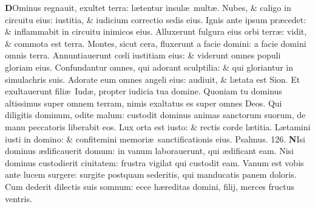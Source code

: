 \documentclass[a5paper,10pt]{book}
\def\ae{æ}
\def\oe{œ}
\begin{document}
\begin{multicols*}{2}
\vspace{-1em}
\lettrine[lines=2]{\bfseries \color{red} D}{}Ominus regnauit, exultet terra: l\ae tentur insul\ae \ mult\ae .
\newline \color{red} N\color{black}ubes, \& caligo in circuitu eius: iustitia, \& iudicium correctio sedis eius.
\newline \color{red} I\color{black}gnis ante ipsum pr\ae cedet: \& inflammabit in circuitu inimicos eius.
\newline \color{red} A\color{black}lluxerunt fulgura eius orbi terr\ae : vidit, \& commota est terra.%
\newline \color{red} M\color{black}ontes, sicut cera, fluxerunt a facie domini: a facie domini omnis terra.
\newline \color{red} A\color{black}nnuntiauerunt c\oe li iustitiam eius: \& viderunt omnes populi gloriam eius.
\newline \color{red} C\color{black}onfundantur omnes, qui adorant sculptilia: \& qui gloriantur in simulachris suis.
\newline \color{red} A\color{black}dorate eum omnes angeli eius: audiuit, \& l\ae tata est Sion.
\newline \color{red} E\color{black}t exultauerunt fili\ae \ Iud\ae , propter iudicia tua domine.
\newline \color{red} Q\color{black}uoniam tu dominus altissimus super omnem terram, nimis exaltatus es super omnes Deos.
\newline \color{red} Q\color{black}ui diligitis dominum, odite malum: custodit dominus animas sanctorum suorum, de manu peccatoris liberabit eos.
\newline \color{red} L\color{black}ux orta est iusto: \& rectis corde l\ae titia.
\newline \color{red} L\color{black}\ae tamini iusti in domino: \& confitemini memori\ae \ sanctificationis eius.
\newline \color{red} Psalmus. \hypertarget{ps126}{126.} \color{black}%
\lettrine[lines=2]{\bfseries \color{red} N}{}Isi dominus \ae dificauerit domum: in vanum laborauerunt, qui \ae dificant eam.
\newline \color{red} N\color{black}isi dominus custodierit ciuitatem: frustra vigilat qui custodit eam.
\newline \color{red} V\color{black}anum est vobis ante lucem surgere: surgite postquam sederitis, qui manducatis panem doloris.
\newline \color{red} C\color{black}um dederit dilectis suis somnum: ecce h\ae reditas domini, filij, merces fructus ventris.

\end{multicols*}
\end{document}
